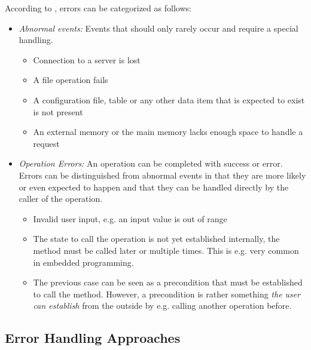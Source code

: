 According to \cite{Sied06}, errors can be categorized as follows:
\begin{itemize}
\item \emph{Abnormal events:} Events that should only rarely occur and require a special handling.
\begin{itemize}
\item Connection to a server is lost
\item A file operation fails
\item A configuration file, table or any other data item that is expected to exist is not present
\item An external memory or the main memory lacks enough space to handle a request
\end{itemize}
\item \emph{Operation Errors:} An operation can be completed with success or error. Errors can be distinguished from abnormal events in that they are more likely or even expected to happen and that they can be handled directly by the caller of the operation.
\begin{itemize}
\item Invalid user input, e.g. an input value is out of range
\item The state to call the operation is not yet established internally, the method must be called later or multiple times. This is e.g. very common in embedded programming.
\item The previous case can be seen as a precondition that must be established to call the method. However, a precondition is rather something \emph{the user can establish} from the outside by e.g. calling another operation before.
\end{itemize}
\end{itemize}


\subsection{Error Handling Approaches}
\label{sec:ErrorHandlingApproaches}

